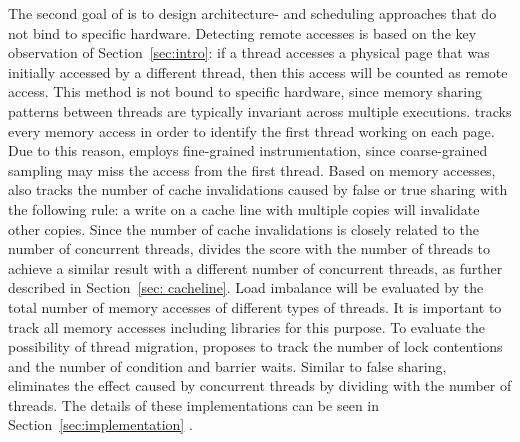 The second goal of \NP{} is to design architecture- and scheduling approaches that do not bind to specific hardware. Detecting remote accesses is based on the key observation of Section~\ref{sec:intro}: if a thread accesses a physical page that was initially accessed by a different thread, then this access will be counted as remote access. This method is not bound to specific hardware, since memory sharing patterns between threads are typically invariant across multiple executions. 
\NP{} tracks every memory access in order to identify the first thread working on each page. Due to this reason, \NP{} employs fine-grained instrumentation, since coarse-grained sampling may miss the access from the first thread. Based on memory accesses, \NP{} also tracks the number of cache invalidations caused by false or true sharing with the following rule: a write on a cache line with multiple copies will invalidate other copies. Since the number of cache invalidations is closely related to the number of concurrent threads, \NP{} divides the score with the number of threads to achieve a similar result with a different number of concurrent threads, as further described in Section~\ref{sec: cacheline}. Load imbalance will be evaluated by the total number of memory accesses of different types of threads. It is important to track all memory accesses including libraries for this purpose. To evaluate the possibility of thread migration, \NP{} proposes to track the number of lock contentions and the number of condition and barrier waits. Similar to false sharing, \NP{} eliminates the effect caused by concurrent threads by dividing with the number of threads. The details of these implementations can be seen in Section~\ref{sec:implementation} . 



